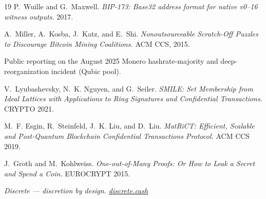 \documentclass[11pt,a4paper]{article}
\begin{document}
\begin{thebibliography}{19}
 P.~Wuille and G.~Maxwell.
\emph{BIP-173: Base32 address format for native v0--16 witness outputs.} 2017.

 A.~Miller, A.~Kosba, J.~Katz, and E.~Shi.
\emph{Nonoutsourceable Scratch-Off Puzzles to Discourage Bitcoin Mining
Coalitions.} ACM CCS, 2015.

 Public reporting on the August 2025 Monero hashrate-majority
and deep-reorganization incident (Qubic pool).

 V.~Lyubashevsky, N.~K. Nguyen, and G.~Seiler.
\emph{SMILE: Set Membership from Ideal Lattices with Applications to Ring
Signatures and Confidential Transactions.} CRYPTO 2021.

 M.~F. Esgin, R.~Steinfeld, J.~K. Liu, and D.~Liu.
\emph{MatRiCT: Efficient, Scalable and Post-Quantum Blockchain Confidential
Transactions Protocol.} ACM CCS 2019.

 J.~Groth and M.~Kohlweiss.
\emph{One-out-of-Many Proofs: Or How to Leak a Secret and Spend a Coin.}
EUROCRYPT 2015.

\end{thebibliography}

\vspace{1.2em}
\begin{center}
\small\itshape
Discrete --- discretion by design.\quad
\href{https://discrete.cash}{discrete.cash}
\end{center}
\end{document}
